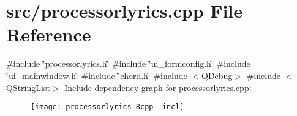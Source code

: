 \section{src/processorlyrics.cpp File Reference}
\label{processorlyrics_8cpp}
{\ttfamily \#include \char`\"{}processorlyrics.\+h\char`\"{}}\newline
{\ttfamily \#include \char`\"{}ui\+\_\+formconfig.\+h\char`\"{}}\newline
{\ttfamily \#include \char`\"{}ui\+\_\+mainwindow.\+h\char`\"{}}\newline
{\ttfamily \#include \char`\"{}chord.\+h\char`\"{}}\newline
{\ttfamily \#include $<$Q\+Debug$>$}\newline
{\ttfamily \#include $<$Q\+String\+List$>$}\newline
Include dependency graph for processorlyrics.\+cpp\+:\nopagebreak
\begin{figure}[H]
\begin{center}
\leavevmode
\texttt{[image: processorlyrics\_8cpp\_\_incl]}
\end{center}
\end{figure}
